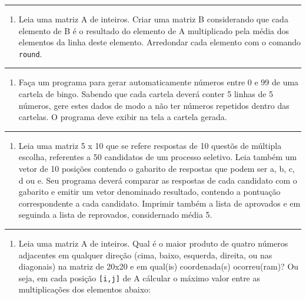 \documentclass[12pt,a4paper]{article}
\providecommand{\tightlist}{%
      \setlength{\itemsep}{0pt}\setlength{\parskip}{0pt}}
\begin{document}
    \begin{center}\rule{0.5\linewidth}{0.5pt}\end{center}

\begin{enumerate}
\def\labelenumi{\arabic{enumi}.}
\setcounter{enumi}{2}
\tightlist
\item
  Leia uma matriz A de inteiros. Criar uma matriz B considerando que
  cada elemento de B é o resultado do elemento de A multiplicado pela
  média dos elementos da linha deste elemento. Arredondar cada elemento
  com o comando \texttt{round}.
\end{enumerate}

    \begin{center}\rule{0.5\linewidth}{0.5pt}\end{center}

\begin{enumerate}
\def\labelenumi{\arabic{enumi}.}
\setcounter{enumi}{3}
\tightlist
\item
  Faça um programa para gerar automaticamente números entre 0 e 99 de
  uma cartela de bingo. Sabendo que cada cartela deverá conter 5 linhas
  de 5 números, gere estes dados de modo a não ter números repetidos
  dentro das cartelas. O programa deve exibir na tela a cartela gerada.
\end{enumerate}

    \begin{center}\rule{0.5\linewidth}{0.5pt}\end{center}

\begin{enumerate}
\def\labelenumi{\arabic{enumi}.}
\setcounter{enumi}{4}
\tightlist
\item
  Leia uma matriz 5 x 10 que se refere respostas de 10 questõs de
  múltipla escolha, referentes a 50 candidatos de um processo seletivo.
  Leia também um vetor de 10 posições contendo o gabarito de respostas
  que podem ser a, b, c, d ou e. Seu programa deverá comparar as
  respostas de cada candidato com o gabarito e emitir um vetor
  denominado resultado, contendo a pontuação correspondente a cada
  candidato. Imprimir também a lista de aprovados e em seguinda a lista
  de reprovados, considernado média 5.
\end{enumerate}

    \begin{center}\rule{0.5\linewidth}{0.5pt}\end{center}

\begin{enumerate}
\def\labelenumi{\arabic{enumi}.}
\setcounter{enumi}{5}
\tightlist
\item
  Leia uma matriz A de inteiros. Qual é o maior produto de quatro
  números adjacentes em qualquer direção (cima, baixo, esquerda,
  direita, ou nas diagonais) na matriz de 20x20 e em qual(is)
  coordenada(s) ocorreu(ram)? Ou seja, em cada posição
  \texttt{{[}i,j{]}} de A cálcular o máximo valor entre as
  multiplicações dos elementos abaixo:
\end{enumerate}
\end{document}
